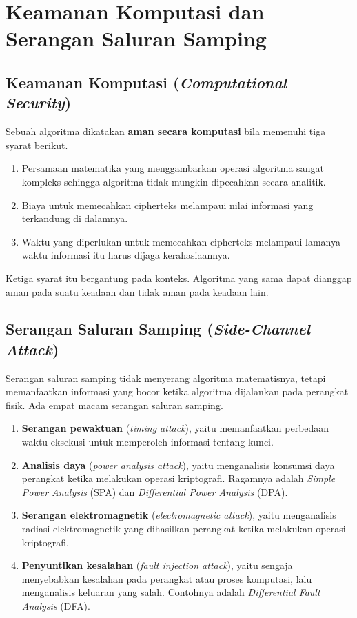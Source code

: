 \section{Keamanan Komputasi dan Serangan Saluran Samping}
\label{sec:side-channel}

\subsection{Keamanan Komputasi (\textit{Computational Security})}

Sebuah algoritma dikatakan \textbf{aman secara komputasi} bila memenuhi tiga
syarat berikut.
\begin{enumerate}
    \item Persamaan matematika yang menggambarkan operasi algoritma sangat
          kompleks sehingga algoritma tidak mungkin dipecahkan secara analitik.
    \item Biaya untuk memecahkan cipherteks melampaui nilai informasi yang
          terkandung di dalamnya.
    \item Waktu yang diperlukan untuk memecahkan cipherteks melampaui lamanya
          waktu informasi itu harus dijaga kerahasiaannya.
\end{enumerate}

Ketiga syarat itu bergantung pada konteks. Algoritma yang sama dapat dianggap
aman pada suatu keadaan dan tidak aman pada keadaan lain.

\subsection{Serangan Saluran Samping (\textit{Side-Channel Attack})}

Serangan saluran samping tidak menyerang algoritma matematisnya, tetapi
memanfaatkan informasi yang bocor ketika algoritma dijalankan pada perangkat
fisik. Ada empat macam serangan saluran samping.
\begin{enumerate}
    \item \textbf{Serangan pewaktuan} (\textit{timing attack}), yaitu memanfaatkan
          perbedaan waktu eksekusi untuk memperoleh informasi tentang kunci.
    \item \textbf{Analisis daya} (\textit{power analysis attack}), yaitu
          menganalisis konsumsi daya perangkat ketika melakukan operasi
          kriptografi. Ragamnya adalah \textit{Simple Power Analysis} (SPA) dan
          \textit{Differential Power Analysis} (DPA).
    \item \textbf{Serangan elektromagnetik} (\textit{electromagnetic attack}),
          yaitu menganalisis radiasi elektromagnetik yang dihasilkan perangkat
          ketika melakukan operasi kriptografi.
    \item \textbf{Penyuntikan kesalahan} (\textit{fault injection attack}), yaitu
          sengaja menyebabkan kesalahan pada perangkat atau proses komputasi,
          lalu menganalisis keluaran yang salah. Contohnya adalah
          \textit{Differential Fault Analysis} (DFA).
\end{enumerate}


